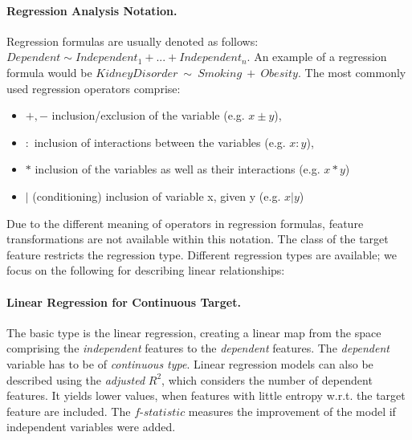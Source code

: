 \documentclass[journal]{style/vgtc} 			          %
\begin{document}
\paragraph{Regression Analysis Notation.} Regression formulas are usually denoted as follows:
$Dependent \sim Independent_1 + ... + Independent_n$.
An example of a regression formula would be $KidneyDisorder~\sim~Smoking~+~Obesity$.
The most commonly used regression operators comprise:
\begin{itemize}
	\item $+,-$ inclusion/exclusion of the variable (e.g. $x\pm y$),
	\item $:$ inclusion of interactions between the variables (e.g. $x:y$),
	\item $*$ inclusion of the variables as well as their interactions (e.g. $x*y$)
	\item $|$ (conditioning) inclusion of variable x, given y (e.g. $x|y$)
\end{itemize}
Due to the different meaning of operators in regression formulas, feature transformations are not available within this notation.
The class of the target feature restricts the regression type.
Different regression types are available; we focus on the following for describing linear relationships:
\paragraph{Linear Regression for Continuous Target.}
The basic type is the linear regression, creating a linear map from the space comprising the \emph{independent} features to the \emph{dependent} features.
The \emph{dependent} variable has to be of \emph{continuous type}.
Linear regression models can also be described using the \emph{adjusted} $R^2$, which considers the number of dependent features.
It yields lower values, when features with little entropy w.r.t. the target feature are included.
The $f$-$statistic$ measures the improvement of the model if independent variables were added. 
\end{document}

